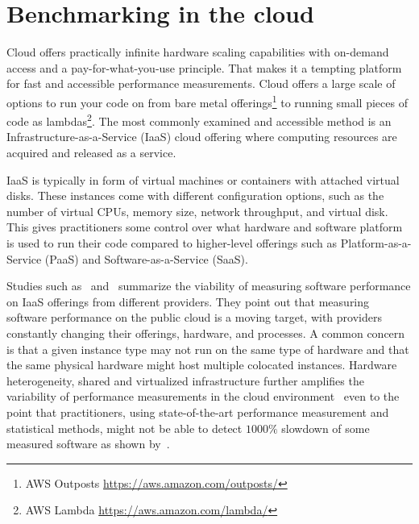 \section{Benchmarking in the cloud}
Cloud offers practically infinite hardware scaling capabilities with on-demand access and a \mbox{pay-for-what-you-use} principle.
That makes it a tempting platform for fast and accessible performance measurements.
Cloud offers a large scale of options to run your code on from bare metal offerings\footnote{AWS Outposts \url{https://aws.amazon.com/outposts/}} to running small pieces of code as lambdas\footnote{AWS Lambda \url{https://aws.amazon.com/lambda/}}.
The most commonly examined and accessible method is an \mbox{Infrastructure-as-a-Service} (IaaS) cloud offering where computing resources are acquired and released as a service.

IaaS is typically in form of virtual machines or containers with attached virtual disks.
These instances come with different configuration options, such as the number of virtual CPUs, memory size, network throughput, and virtual disk.
This gives practitioners some control over what hardware and software platform is used to run their code compared to higher-level offerings such as Platform-as-a-Service (PaaS) and Software-as-a-Service (SaaS).

Studies such as~\citet{leitner2016patterns} and~\citet{laaber2019software} summarize the viability of measuring software performance on IaaS offerings from different providers.
They point out that measuring software performance on the public cloud is a moving target, with providers constantly changing their offerings, hardware, and processes.
A common concern is that a given instance type may not run on the same type of hardware and that the same physical hardware might host multiple colocated instances.
Hardware heterogeneity, shared and virtualized infrastructure further amplifies the variability of performance measurements in the cloud environment~\cite{leitner2016patterns} even to the point that practitioners, using state-of-the-art performance measurement and statistical methods, might not be able to detect $1000\%$ slowdown of some measured software as shown by~\citet{laaber2019software}.

